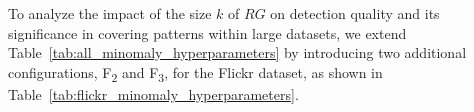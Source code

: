 \documentclass[preprint,12pt]{elsarticle}
\theoremstyle{plain}
\theoremstyle{definition}
\theoremstyle{remark}
\begin{document}
To analyze the impact of the size $k$ of $RG$ on detection quality and its significance in covering patterns within large datasets, we extend Table~\ref{tab:all_minomaly_hyperparameters} by introducing two additional configurations, F\textsubscript{2} and F\textsubscript{3}, for the Flickr dataset, as shown in Table~\ref{tab:flickr_minomaly_hyperparameters}.

\end{document}

